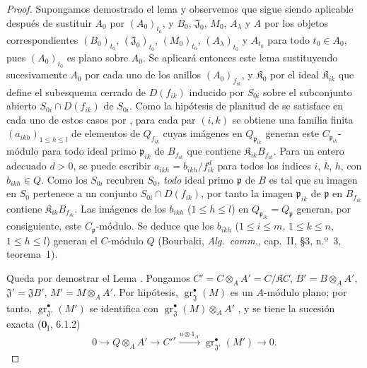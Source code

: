 \begin{proof}
Supongamos demostrado el lema y observemos que sigue siendo aplicable después de sustituir
$A_0$ por $(A_0)_{t_0}$, y $B_0$,
$\mathfrak J_0$, $M_0$, $A_\lambda$ y $A$ por
los objetos correspondientes $(B_0)_{t_0}$, $(\mathfrak J_0)_{t_0}$, $(M_0)_{t_0}$, $(A_\lambda)_{t_0}$ y $A_{t_0}$ para todo $t_0\in A_0$, pues
$(A_0)_{t_0}$ es plano sobre $A_0$. Se aplicará entonces este lema
sustituyendo sucesivamente $A_0$ por cada uno de los anillos
$(A_0)_{f_{ik}}$, y $\mathfrak K_0$ por el ideal
$\mathfrak K_{ik}$ que define el subesquema cerrado de $D(f_{ik})$
inducido por $S_{0i}$ sobre el subconjunto abierto
$S_{0i}\cap D(f_{ik})$ de $S_{0i}$. Como la
hipótesis de planitud de  se satisface en cada uno de estos casos
por , para cada par $(i,k)$ se obtiene una familia finita
$(a_{ikh})_{1\leq h\leq l}$ de elementos de
$Q_{f_{ik}}$ cuyas imágenes en $Q_{\mathfrak p_{ik}}$
generan este $C_{\mathfrak p_{ik}}$-módulo para todo ideal primo
$\mathfrak p_{ik}$ de $B_{f_{ik}}$ que contiene
$\mathfrak K_{ik}B_{f_{ik}}$. Para un entero adecuado $d>0$, se
puede escribir
$a_{ikh}=b_{ikh}/f_{ik}^d$ para todos los índices $i$, $k$, $h$, con $b_{ikh}\in Q$. Como los $S_{0i}$ recubren $S_0$, \emph{todo} ideal primo $\mathfrak p$ de $B$ es tal que su imagen en $S_0$ pertenece a un conjunto $S_{0i}\cap D(f_{ik})$, por tanto la imagen $\mathfrak p_{ik}$ de $\mathfrak p$ en $B_{f_{ik}}$ contiene $\mathfrak K_{ik}B_{f_{ik}}$. Las imágenes de los $b_{ikh}$ ($1\leq h\leq l$) en $Q_{\mathfrak p_{ik}}=Q_\mathfrak p$ generan, por consiguiente, este $C_\mathfrak p$-módulo. Se deduce que los $b_{ikh}$ ($1\leq i\leq m$, $1\leq k\leq n$, $1\leq h\leq l$) generan el $C$-módulo $Q$ (Bourbaki, \emph{Alg.\ comm.}, cap.~II, \S3, n.º~3, teorema~1).

Queda por demostrar el Lema . Pongamos
$C'=C\otimes_AA'=C/\mathfrak KC$, $B'=B\otimes_AA'$, $\mathfrak J'=\mathfrak JB'$,
$M'=M\otimes_AA'$.
Por hipótesis, $\operatorname{gr}_{\mathfrak J}^\bullet(M)$ es un $A$-módulo plano; por tanto, $\operatorname{gr}_{\mathfrak J'}^\bullet(M')$ se identifica con $\operatorname{gr}_{\mathfrak J}^\bullet(M)\otimes_AA'$ , y se tiene la sucesión exacta ($\mathbf 0_{\mathrm I}$, 6.1.2)
\begin{equation}
0\longrightarrow Q\otimes_AA'\longrightarrow C'^{r}
\xrightarrow{u\otimes1_{A'}}\operatorname{gr}_{\mathfrak J'}^\bullet(M')
\longrightarrow0.
\label{IV.11.2.9.7-fr}
\tag{11.2.9.7}
\end{equation}


\end{proof}
